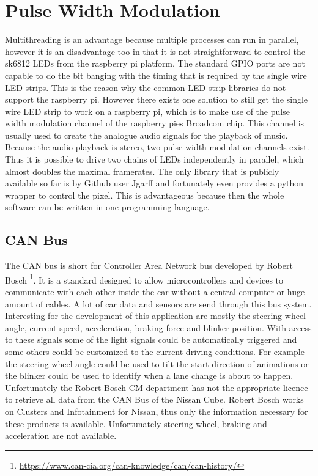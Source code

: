 \section{Pulse Width Modulation}
Multithreading is an advantage because multiple processes can run in parallel, however it is an disadvantage too in that it is not straightforward to control the sk6812 LEDs from the raspberry pi platform. The standard GPIO ports are not capable to do the bit banging with the timing that is required by the single wire LED strips. This is the reason why the common LED strip libraries do not support the raspberry pi. However there exists one solution to still get the single wire LED strip to work on a raspberry pi, which is to make use of the pulse width modulation channel of the raspberry pies Broadcom chip. This channel is usually used to create the analogue audio signals for the playback of music. Because the audio playback is stereo, two pulse width modulation channels exist. Thus it is possible to drive two chains of LEDs independently in parallel, which almost doubles the maximal framerates. The only library that is publicly available so far is by Github user Jgarff \cite{Jgarff2018UserspaceLEDs} and fortunately even provides a python wrapper to control the pixel. This is advantageous because then the whole software can be written in one programming language. 


\subsection{CAN Bus}
\label{ssec:CANbus}
The CAN bus is short for Controller Area Network bus developed by Robert Bosch \footnote{\url{https://www.can-cia.org/can-knowledge/can/can-history/}}. It is a standard designed to allow microcontrollers and devices to communicate with each other inside the car without a central computer or huge amount of cables. A lot of car data and sensors are send through this bus system. Interesting for the development of this application are mostly the steering wheel angle, current speed, acceleration, braking force and blinker position. With access to these signals some of the light signals could be automatically triggered and some others could be customized to the current driving conditions. For example the steering wheel angle could be used to tilt the start direction of animations or the blinker could be used to identify when a lane change is about to happen. Unfortunately the Robert Bosch CM department has not the appropriate licence to retrieve all data from the CAN Bus of the Nissan Cube. Robert Bosch works on Clusters and Infotainment for Nissan, thus only the information necessary for these products is available. Unfortunately steering wheel, braking and acceleration are not available. 


